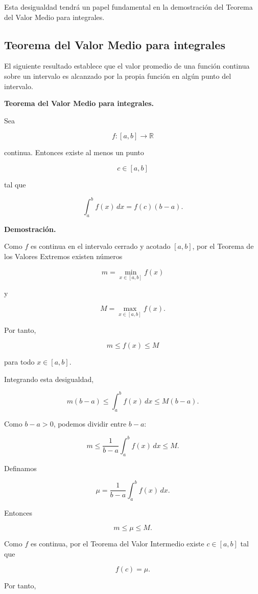 \documentclass[12pt]{article}
\begin{document}
Esta desigualdad tendrá un papel fundamental en la demostración del
Teorema del Valor Medio para integrales.

\subsection{Teorema del Valor Medio para integrales}

El siguiente resultado establece que el valor promedio de una función
continua sobre un intervalo es alcanzado por la propia función en algún
punto del intervalo.

\textbf{Teorema del Valor Medio para integrales.}

Sea

\[
f:[a,b]\longrightarrow\mathbb{R}
\]

continua. Entonces existe al menos un punto

\[
c\in[a,b]
\]

tal que

\[
\boxed{
\int_a^b f(x)\,dx
=
f(c)(b-a).
}
\]

\textbf{Demostración.}

Como $f$ es continua en el intervalo cerrado y acotado $[a,b]$, por el
Teorema de los Valores Extremos existen números

\[
m=\min_{x\in[a,b]}f(x)
\]

y

\[
M=\max_{x\in[a,b]}f(x).
\]

Por tanto,

\[
m\leq f(x)\leq M
\]

para todo $x\in[a,b]$.

Integrando esta desigualdad,

\[
m(b-a)
\leq
\int_a^b f(x)\,dx
\leq
M(b-a).
\]

Como $b-a>0$, podemos dividir entre $b-a$:

\[
m
\leq
\frac{1}{b-a}
\int_a^b f(x)\,dx
\leq
M.
\]

Definamos

\[
\mu
=
\frac{1}{b-a}
\int_a^b f(x)\,dx.
\]

Entonces

\[
m\leq\mu\leq M.
\]

Como $f$ es continua, por el Teorema del Valor Intermedio existe
$c\in[a,b]$ tal que

\[
f(c)=\mu.
\]

Por tanto,
\end{document}
